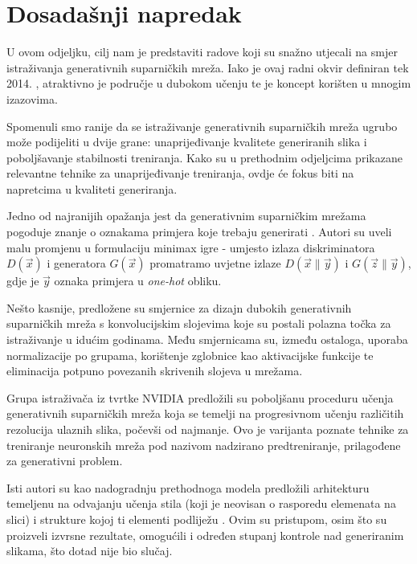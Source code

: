 \section{Dosadašnji napredak}
\label{prijasnji_rad}
U ovom odjeljku, cilj nam je predstaviti radove koji su snažno utjecali na smjer istraživanja generativnih suparničkih mreža. Iako je ovaj radni okvir definiran tek 2014. , atraktivno je područje u dubokom učenju te je koncept korišten u mnogim izazovima.

Spomenuli smo ranije da se istraživanje generativnih suparničkih mreža ugrubo može podijeliti u dvije grane: unaprijeđivanje kvalitete generiranih slika i poboljšavanje stabilnosti treniranja. Kako su u prethodnim odjeljcima prikazane relevantne tehnike za unaprijeđivanje treniranja, ovdje će fokus biti na napretcima u kvaliteti generiranja.

Jedno od najranijih opažanja jest da generativnim suparničkim mrežama pogoduje znanje o oznakama primjera koje trebaju generirati . Autori su uveli malu promjenu u formulaciju minimax igre - umjesto izlaza diskriminatora $D(\vec{x})$ i generatora $G(\vec{x})$ promatramo uvjetne izlaze $D(\vec{x}\|\vec{y})$ i $G(\vec{z}\|\vec{y})$, gdje je $\vec{y}$ oznaka primjera u \textit{one-hot} obliku.

Nešto kasnije, predložene su smjernice za dizajn dubokih generativnih suparničkih mreža s konvolucijskim slojevima  koje su postali polazna točka za istraživanje u idućim godinama. Među smjernicama su, između ostaloga, uporaba normalizacije po grupama, korištenje zglobnice kao aktivacijske funkcije te eliminacija potpuno povezanih skrivenih slojeva u mrežama.

Grupa istraživača iz tvrtke NVIDIA predložili su poboljšanu proceduru učenja generativnih suparničkih mreža koja se temelji na progresivnom učenju različitih rezolucija ulaznih slika, počevši od najmanje.  Ovo je varijanta poznate tehnike za treniranje neuronskih mreža pod nazivom nadzirano predtreniranje, prilagođene za generativni problem.

Isti autori su kao nadogradnju prethodnoga modela predložili arhitekturu temeljenu na odvajanju učenja stila (koji je neovisan o rasporedu elemenata na slici) i strukture kojoj ti elementi podliježu . Ovim su pristupom, osim što su proizveli izvrsne rezultate, omogućili i određen stupanj kontrole nad generiranim slikama, što dotad nije bio slučaj.

